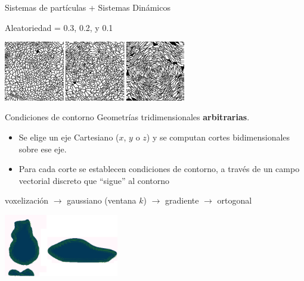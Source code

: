 \documentclass[spanish,unknownkeysallowed,10pt]{beamer}
\begin{document}

\begin{frame}{Sistemas de partículas + Sistemas Dinámicos}

\centering
Aleatoriedad = 0.3, 0.2, y 0.1

\vspace{0.1cm}
  \includegraphics[width=8cm]{../figures/Fig3}

\end{frame}

\begin{frame}{Condiciones de contorno}
Geometrías tridimensionales \textbf{arbitrarias}.

\begin{itemize}
\item Se elige un eje Cartesiano ($x$, $y$ o $z$) y se computan cortes bidimensionales sobre ese eje.
\item Para cada corte se establecen condiciones de contorno, a través de un campo vectorial discreto que ``sigue'' al contorno
\end{itemize}

voxelización $\rightarrow$ gaussiano (ventana $k$) $\rightarrow$ gradiente $\rightarrow$ ortogonal

  \centerline{\includegraphics[width=5cm]{../figures/Fig4}}
\end{frame}
\end{document}
